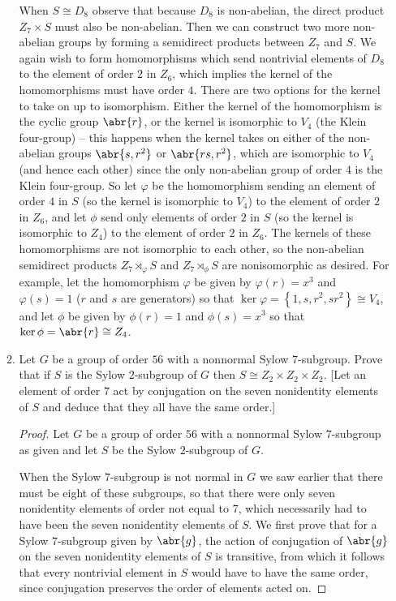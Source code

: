 \documentclass[11pt]{article}
\newcommand{\cbr}[1]{\left\{#1\right\}}
\begin{document}
\begin{enumerate}
\begin{enumerate}[label=\textbf{(\alph*)}]
        When $S\cong D_8$ observe that because $D_8$ is non-abelian, the direct product $Z_7\times S$ must also be non-abelian.  Then we can construct two more non-abelian groups by forming a semidirect products between $Z_7$ and $S$. We again wish to form homomorphisms which send nontrivial elements of $D_8$ to the element of order $2$ in $Z_6$, which implies the kernel of the homomorphisms must have order $4$. There are two options for the kernel to take on up to isomorphism. Either the kernel of the homomorphism is the cyclic group $\abr{r}$, or the kernel is isomorphic to $V_4$ (the Klein four-group) -- this happens when the kernel takes on either of the non-abelian groups $\abr{s,r^2}$ or $\abr{rs, r^2}$, which are isomorphic to $V_4$ (and hence each other) since the only non-abelian group of order $4$ is the Klein four-group. So let $\varphi$ be the homomorphism sending an element of order $4$ in $S$ (so the kernel is isomorphic to $V_4$) to the element of order $2$ in $Z_6$, and let $\phi$ send only elements of order $2$ in $S$ (so the kernel is isomorphic to $Z_4$) to the element of order $2$ in $Z_6$. The kernels of these homomorphisms are not isomorphic to each other, so the non-abelian semidirect products  $Z_7\rtimes_{\varphi} S$ and $Z_7\rtimes_{\phi} S$ are nonisomorphic as desired. For example, let the homomorphism $\varphi$ be given by $\varphi(r) = x^3$ and $\varphi(s) = 1$ ($r$ and $s$ are generators) so that $\ker{\varphi} = \cbr{1,s,r^2, sr^2} \cong V_4$, and let $\phi$ be given by $\phi(r) = 1$ and $\phi(s) = x^3$ so that $\ker{\phi} = \abr{r}\cong Z_4$.
        \item Let $G$ be a group of order $56$ with a nonnormal Sylow $7$-subgroup. Prove that if $S$ is the Sylow $2$-subgroup of $G$ then $S\cong Z_2\times Z_2\times Z_2$. [Let an element of order $7$ act by conjugation on the seven nonidentity elements of $S$ and deduce that they all have the same order.]
        \begin{proof}
          Let $G$ be a group of order $56$ with a nonnormal Sylow $7$-subgroup as given and let $S$ be the Sylow $2$-subgroup of $G$.

          When the Sylow $7$-subgroup is not normal in $G$ we saw earlier that there must be eight of these subgroups, so that there were only seven nonidentity elements of order not equal to $7$, which necessarily had to have been the seven nonidentity elements of $S$. We first prove that for a Sylow $7$-subgroup given by $\abr{g}$, the action of conjugation of $\abr{g}$ on the seven nonidentity elements of $S$ is transitive, from which it follows that every nontrivial element in $S$ would have to have the same order, since conjugation preserves the order of elements acted on.


\end{proof}
\end{enumerate}
\end{enumerate}
\end{document}
